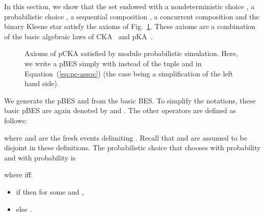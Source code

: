\documentclass{llncs}
\newcommand{\<}{\langle}
\renewcommand{\>}{\rangle}
\begin{document}
In this section, we show that the set   endowed with a nondeterministic choice , a probabilistic choice , a sequential composition , a concurrent composition  and the binary Kleene star  satisfy the axioms of Fig.~\ref{fig:axioms}. These axioms are a combination of the basic algebraic laws of CKA~\cite{Hoa09} and pKA~\cite{Mci05}. 
\begin{figure}
\hspace{-1cm}\begin{minipage}{.5\linewidth}

\end{minipage}
\begin{minipage}{.57\linewidth}

\end{minipage}

\hspace{-1cm}\begin{minipage}{.5\linewidth}

\end{minipage}
\begin{minipage}{.57\linewidth}

\end{minipage}

\hspace{-1cm}\begin{minipage}{.5\linewidth}

\end{minipage}
\begin{minipage}{.57\linewidth}

\end{minipage}



\caption{Axioms of pCKA satisfied by  modulo probabilistic simulation. Here, we write a pBES simply with  instead of the tuple  and  in Equation~(\ref{eq:pc-assoc}) (the case  being a simplification of the left hand side).}\label{fig:axioms}
\end{figure}

We generate the pBES  and  from the basic BES. To simplify the notations, these basic  pBES are again denoted by  and . The other operators are defined as follows:

where  and  are the fresh events delimiting . Recall that  and  are assumed to be disjoint in these definitions. The probabilistic choice that chooses  with probability  and  with probability  is

where  iff:
\begin{itemize}
\item if  then  for some  and ,
\item else .
\end{itemize}
\end{document}
